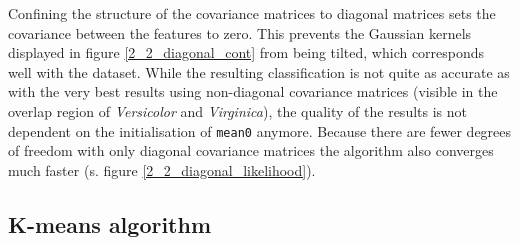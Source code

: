 \documentclass{article}
\begin{document}
Confining the structure of the covariance matrices to diagonal matrices sets the covariance between the features to zero. This prevents the Gaussian kernels displayed in figure \ref{2_2_diagonal_cont} from being tilted, which corresponds well with the dataset. While the resulting classification is not quite as accurate as with the very best results using non-diagonal covariance matrices (visible in the overlap region of \textit{Versicolor} and \textit{Virginica}), the quality of the results is not dependent on the initialisation of \texttt{mean0} anymore. Because there are fewer degrees of freedom with only diagonal covariance matrices the algorithm also converges much faster (s. figure \ref{2_2_diagonal_likelihood}).

\clearpage

\subsection{K-means algorithm}
\end{document}
